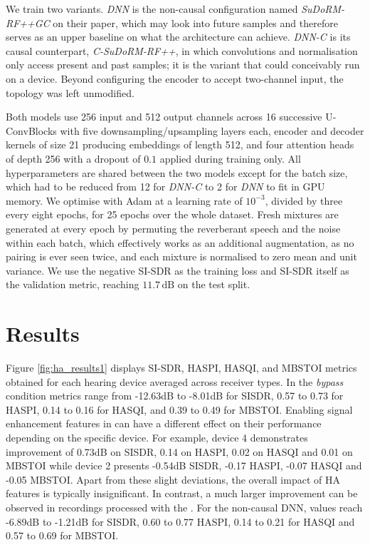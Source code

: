 We train two variants. \emph{DNN} is the non-causal configuration named \emph{SuDoRM-RF++GC} on their paper, which may look into future samples and
therefore serves as an upper baseline on what the architecture can achieve.
\emph{\acrshort{DNN}-C} is its causal counterpart, \emph{C-SuDoRM-RF++}, in which
convolutions and normalisation only access present and past samples; it is the variant that could conceivably
run on a  device. Beyond configuring the encoder to accept two-channel
input, the topology was left unmodified.

Both models use 256 input and 512 output channels across 16 successive
U-ConvBlocks with five downsampling/upsampling layers each, encoder and decoder
kernels of size 21 producing embeddings of length 512, and four attention heads
of depth 256 with a dropout of $0.1$ applied during training only. All
hyperparameters are shared between the two models except for the batch size, which
had to be reduced from 12 for \emph{\acrshort{DNN}-C} to 2 for \emph{DNN} to fit in GPU
memory. We optimise with Adam at a learning rate of $10^{-3}$, divided by
three every eight epochs, for 25 epochs over the whole dataset. Fresh mixtures
are generated at every epoch by permuting the reverberant speech and the noise
within each batch, which effectively works as an additional augmentation, as no pairing is
ever seen twice,  and each mixture is normalised to zero mean and unit
variance. We use the negative \acrshort{SI-SDR} as the training loss and \acrshort{SI-SDR} itself as the validation metric, reaching $11.7\,\text{dB}$ on the test split.



\section{Results}
\label{sec:ha_results}

Figure \ref{fig:ha_results1} displays \acrshort{SI-SDR}, \acrshort{HASPI}, \acrshort{HASQI}, and \acrshort{MBSTOI} metrics obtained for each hearing device averaged across receiver types. In the \textit{bypass} condition metrics range from -12.63dB to -8.01dB for SISDR, 0.57 to 0.73 for \acrshort{HASPI}, 0.14 to 0.16 for \acrshort{HASQI}, and 0.39 to 0.49 for \acrshort{MBSTOI}. Enabling signal enhancement features in  can have a different effect on their performance depending on the specific device. For example, device 4 demonstrates improvement of 0.73dB on SISDR, 0.14 on \acrshort{HASPI}, 0.02 on \acrshort{HASQI} and 0.01 on \acrshort{MBSTOI} while device 2 presents -0.54dB SISDR, -0.17 \acrshort{HASPI}, -0.07 \acrshort{HASQI} and -0.05 \acrshort{MBSTOI}. Apart from these slight deviations, the overall impact of HA features is typically insignificant. In contrast, a much larger improvement can be observed in recordings processed with the . For the non-causal DNN, values reach -6.89dB to -1.21dB for SISDR, 0.60 to 0.77 \acrshort{HASPI}, 0.14 to 0.21 for \acrshort{HASQI}  and 0.57 to 0.69 for \acrshort{MBSTOI}. 


